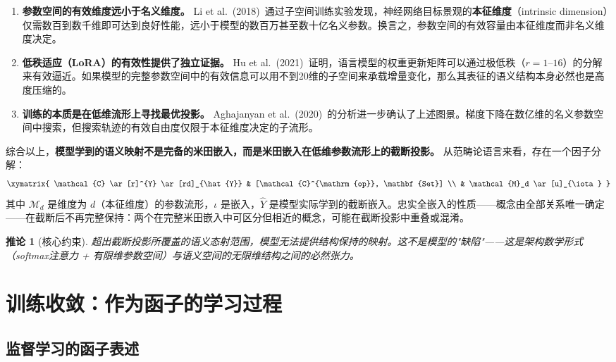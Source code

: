 \documentclass[11pt,a4paper]{ctexart}
\newtheorem{corollary}[theorem]{推论}
\begin{document}
\begin{enumerate}[leftmargin=*]
    \item \textbf{参数空间的有效维度远小于名义维度。} Li et al.\ (2018)\ \cite{Li2018IntrinsicDim}通过子空间训练实验发现，神经网络目标景观的\textbf{本征维度}（intrinsic dimension）仅需数百到数千维即可达到良好性能，远小于模型的数百万甚至数十亿名义参数。换言之，参数空间的有效容量由本征维度而非名义维度决定。

    \item \textbf{低秩适应（LoRA）的有效性提供了独立证据。} Hu et al.\ (2021)\ \cite{Hu2021LoRA}证明，语言模型的权重更新矩阵可以通过极低秩（$r=1$--$16$）的分解来有效逼近。如果模型的完整参数空间中的有效信息可以用不到20维的子空间来承载增量变化，那么其表征的语义结构本身必然也是高度压缩的。

    \item \textbf{训练的本质是在低维流形上寻找最优投影。} Aghajanyan et al.\ (2020)\ \cite{Aghajanyan2020}的分析进一步确认了上述图景。梯度下降在数亿维的名义参数空间中搜索，但搜索轨迹的有效自由度仅限于本征维度决定的子流形。
\end{enumerate}

综合以上，\textbf{模型学到的语义映射不是完备的米田嵌入，而是米田嵌入在低维参数流形上的截断投影。} 从范畴论语言来看，存在一个因子分解：
\begin{equation}
    \xymatrix{
        \mathcal{C} \ar[r]^{Y} \ar[rd]_{\hat{Y}} & [\mathcal{C}^{\mathrm{op}}, \mathbf{Set}] \\
        & \mathcal{M}_d \ar[u]_{\iota}
    }
\end{equation}
其中 $\mathcal{M}_d$ 是维度为 $d$（本征维度）的参数流形，$\iota$ 是嵌入，$\hat{Y}$ 是模型实际学到的截断嵌入。忠实全嵌入的性质——概念由全部关系唯一确定——在截断后不再完整保持：两个在完整米田嵌入中可区分但相近的概念，可能在截断投影中重叠或混淆。

\begin{corollary}[核心约束]
    超出截断投影所覆盖的语义态射范围，模型无法提供结构保持的映射。这不是模型的"缺陷"——这是架构数学形式（softmax注意力 + 有限维参数空间）与语义空间的无限维结构之间的必然张力。
\end{corollary}


\section{训练收敛：作为函子的学习过程}

\subsection{监督学习的函子表述}
\end{document}
